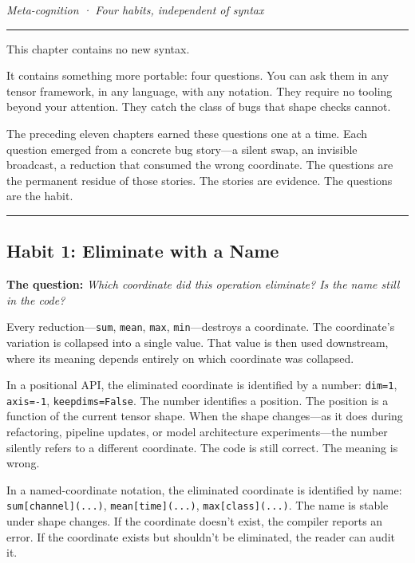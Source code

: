 \documentclass[11pt,]{article}
\begin{document}
\emph{Meta-cognition · Four habits, independent of syntax}

\begin{center}\rule{0.5\linewidth}{0.4pt}\end{center}

This chapter contains no new syntax.

It contains something more portable: four questions. You can ask them in
any tensor framework, in any language, with any notation. They require
no tooling beyond your attention. They catch the class of bugs that
shape checks cannot.

The preceding eleven chapters earned these questions one at a time. Each
question emerged from a concrete bug story---a silent swap, an invisible
broadcast, a reduction that consumed the wrong coordinate. The questions
are the permanent residue of those stories. The stories are evidence.
The questions are the habit.

\begin{center}\rule{0.5\linewidth}{0.4pt}\end{center}

\hypertarget{habit-1-eliminate-with-a-name}{%
\subsection{Habit 1: Eliminate with a
Name}\label{habit-1-eliminate-with-a-name}}

\textbf{The question:} \emph{Which coordinate did this operation
eliminate? Is the name still in the code?}

Every reduction---\texttt{sum}, \texttt{mean}, \texttt{max},
\texttt{min}---destroys a coordinate. The coordinate's variation is
collapsed into a single value. That value is then used downstream, where
its meaning depends entirely on which coordinate was collapsed.

In a positional API, the eliminated coordinate is identified by a
number: \texttt{dim=1}, \texttt{axis=-1}, \texttt{keepdims=False}. The
number identifies a position. The position is a function of the current
tensor shape. When the shape changes---as it does during refactoring,
pipeline updates, or model architecture experiments---the number
silently refers to a different coordinate. The code is still correct.
The meaning is wrong.

In a named-coordinate notation, the eliminated coordinate is identified
by name: \texttt{sum{[}channel{]}(...)}, \texttt{mean{[}time{]}(...)},
\texttt{max{[}class{]}(...)}. The name is stable under shape changes. If
the coordinate doesn't exist, the compiler reports an error. If the
coordinate exists but shouldn't be eliminated, the reader can audit it.
\end{document}
